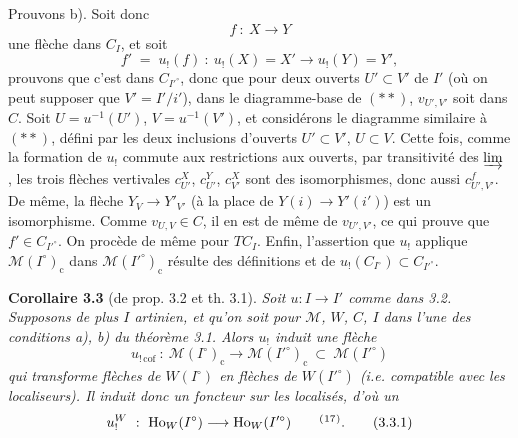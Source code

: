 \documentclass[11pt]{article}
\newcommand{\printedpage}[1]{\marginpar{\footnotesize p.~#1}}
\newcommand{\msp}[1]{\marginpar{\footnotesize [#1]}}
\begin{document}
Prouvons b). Soit donc
\[
f\ :\ X\longrightarrow Y
\]
une flèche dans $C_I$, et soit
\[
f' \;=\; u_!(f)\ :\ u_!(X)=X' \longrightarrow u_!(Y)=Y',
\]
prouvons que c'est dans $C_{I'^\circ}$, donc que
\msp{54}
pour deux ouverts $U'\subset V'$ de $I'$ (où on peut supposer que $V'=I'/i'$), dans le diagramme-base de $(**)$, $v_{U',V'}$ soit dans $C$. Soit $U=u^{-1}(U')$, $V=u^{-1}(V')$, et considérons le %
diagramme similaire à $(**)$, défini par les deux inclusions d'ouverts $U'\subset V'$, $U\subset V$. Cette fois, comme la formation de $u_!$ commute aux restrictions aux ouverts, par transitivité des $\varinjlim$ , les trois flèches vertivales $c^X_{U'}$, $c^Y_{U'}$, $c^X_{V'}$ sont des isomorphismes, donc aussi $c^f_{U',V'}$. De %
même, la flèche $Y_V\longrightarrow Y'_{V'}$ (à la place de $Y(i)\longrightarrow Y'(i')$) est un isomorphisme. Comme $v_{U,V}\in C$, il en est de même de $v_{U',V'}$, ce qui prouve que $f'\in C_{I'^\circ}$. On procède de même pour $TC_I$. Enfin, l'assertion que $u_!$ applique $\mathcal{M}(I^\circ)_{\mathrm{c}}$ dans $\mathcal{M}(I'^\circ)_{\mathrm{c}}$ résulte des définitions et de $u_!(C_{I^\circ})\subset C_{I'^\circ}$.

\textbf{Corollaire 3.3} (de prop. 3.2 et th. 3.1). \textit{Soit $u:I\longrightarrow I'$ comme dans \textup{3.2}. Supposons de plus $I$ artinien, et}
\printedpage{28}
\msp{55}
\textit{qu'on soit pour $\mathcal{M}$, $W$, $C$, $I$ dans l'une des conditions \textup{a), b)} du théorème \textup{3.1}. Alors $u_!$ induit une flèche}
\[
u_{!\,\mathrm{cof}}\ :\ \mathcal{M}(I^\circ)_{\mathrm{c}} \longrightarrow \mathcal{M}(I'^\circ)_{\mathrm{c}}\ \subset\ \mathcal{M}(I'^\circ)
\]
\textit{qui transforme flèches de $W(I^\circ)$ en flèches de $W(I'^\circ)$ (i.e. compatible avec les localiseurs). Il induit donc un foncteur sur les localisés, d'où un}
\[
u_!^W\ :\ \mathrm{Ho}_W(I^\circ) \longrightarrow \mathrm{Ho}_W(I'^\circ) \qquad \mbox{\textsuperscript{(}\footnotemark[17]\textsuperscript{)}}.
\tag*{(3.3.1)}
\]
\end{document}
